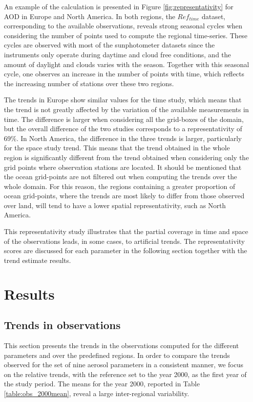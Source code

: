 \documentclass[acp, manuscript]{copernicus}
\begin{document}
An example of the calculation is presented in Figure \ref{fig:representativity} for AOD in Europe and North America. In both regions, the $Ref_{time}$ dataset, corresponding to the available observations, reveals strong seasonal cycles when considering the number of points used to compute the regional time-series. These cycles are observed with most of the sunphotometer datasets since the instruments only operate during daytime and cloud free conditions, and the amount of daylight and clouds varies with the season. Together with this seasonal cycle, one observes an increase in the number of points with time, which reflects the increasing number of stations over these two regions. 

The trends in Europe show similar values for the time study, which means that the trend is not greatly affected by the variation of the available measurements in time. The difference is larger when considering all the grid-boxes of the domain, but the overall difference of the two studies corresponds to a representativity of 69\%. In North America, the difference in the three trends is larger, particularly for the space study trend. This means that the trend obtained in the whole region is significantly different from the trend obtained when considering only the grid points where observation stations are located. It should be mentioned that the ocean grid-points are not filtered out when computing the trends over the whole domain. For this reason, the regions containing a greater proportion of ocean grid-points, where the trends are most likely to differ from those observed over land, will tend to have a lower spatial representativity, such as North America.

This representativity study illustrates that the partial coverage in time and space of the observations leads, in some cases, to artificial trends. The representativity scores are discussed for each parameter in the following section together with the trend estimate results.

\section{Results}

\subsection{Trends in observations}\label{obs_trends}
This section presents the trends in the observations computed for the different parameters and over the predefined regions. In order to compare the trends observed for the set of nine aerosol parameters in a consistent manner, we focus on the relative trends, with the reference set to the year 2000, as the first year of the study period. The means for the year 2000, reported in Table \ref{table:obs_2000mean}, reveal a large inter-regional variability.
\end{document}
